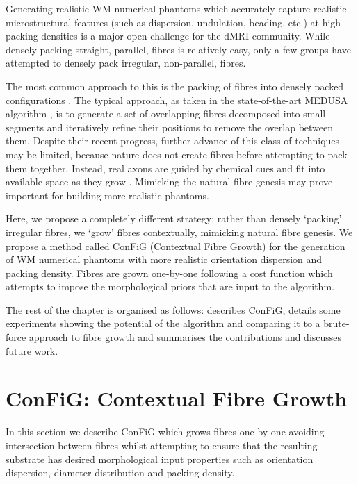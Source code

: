 Generating realistic WM numerical phantoms which accurately capture realistic microstructural features (such as dispersion, undulation, beading, etc.) at high packing densities is a major open challenge for the dMRI community.
While densely packing straight, parallel, fibres is relatively easy, only a few groups have attempted to densely pack irregular, non-parallel, fibres.

The most common approach to this is the packing of fibres into densely packed configurations \cite{Close2009,Ginsburger2018,Ginsburger2019,Rafael-Patino2018}.
The typical approach, as taken in the state-of-the-art MEDUSA algorithm \cite{Ginsburger2019}, is to generate a set of overlapping fibres decomposed into small segments and iteratively refine their positions to remove the overlap between them.
Despite their recent progress, further advance of this class of techniques may be limited, because nature does not create fibres before attempting to pack them together.
Instead, real axons are guided by chemical cues and fit into available space as they grow \cite{Price2017,Lowery2009}.
Mimicking the natural fibre genesis may prove important for building more realistic phantoms.

Here, we propose a completely different strategy: rather than densely `packing' irregular fibres, we `grow' fibres contextually, mimicking natural fibre genesis.
We propose a method called ConFiG (Contextual Fibre Growth) for the generation of WM numerical phantoms with more realistic orientation dispersion and packing density.
Fibres are grown one-by-one following a cost function which attempts to impose the morphological priors that are input to the algorithm.

The rest of the chapter is organised as follows:  describes ConFiG,  details some experiments showing the potential of the algorithm and comparing it to a brute-force approach to fibre growth and  summarises the contributions and discusses future work.


\section{ConFiG: Contextual Fibre Growth}
\label{sec:ipmi_config_description}
In this section we describe ConFiG  which grows fibres one-by-one avoiding intersection between fibres whilst attempting to ensure that the resulting substrate has desired morphological input properties such as orientation dispersion, diameter distribution and packing density.

